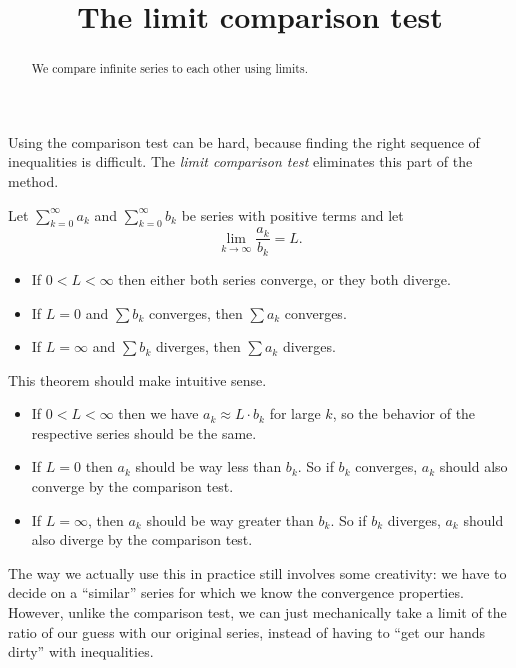 \documentclass{ximera}
\title[Dig-In:]{The limit comparison test}
\begin{document}
\begin{abstract}
We compare infinite series to each other using limits.
\end{abstract}
\maketitle

Using the comparison test can be hard, because finding the right
sequence of inequalities is difficult.  The \textit{limit comparison test}
eliminates this part of the method.

\begin{theorem}
  Let $\sum_{k=0}^\infty a_k$ and $\sum_{k=0}^\infty b_k$ be series with positive
  terms and let
  \[
  \lim_{k \to \infty} \frac{a_k}{b_k} = L.
  \]
  \begin{itemize}
  \item If $0<L<\infty$ then either both series converge, or they both diverge.
  \item If $L=0$ and $\sum b_k$ converges, then $\sum a_k$ converges.
  \item If $L=\infty$ and $\sum b_k$ diverges, then $\sum a_k$ diverges.
  \end{itemize}
\end{theorem}

This theorem should make intuitive sense.
\begin{itemize}
\item If $0<L<\infty$ then we have $a_k \approx L \cdot b_k$ for large
  $k$, so the behavior of the respective series should be the same.
\item If $L=0$ then $a_k$ should be way less than $b_k$.  So if $b_k$
  converges, $a_k$ should also converge by the comparison test.
\item If $L=\infty$, then $a_k$ should be way greater than $b_k$. So
  if $b_k$ diverges, $a_k$ should also diverge by the comparison test.
\end{itemize}

The way we actually use this in practice still involves some
creativity: we have to decide on a ``similar'' series for which we know
the convergence properties.  However, unlike the comparison test,
we can just mechanically take a limit of the ratio of our guess with
our original series, instead of having to ``get our hands dirty''
with inequalities.
\end{document}
